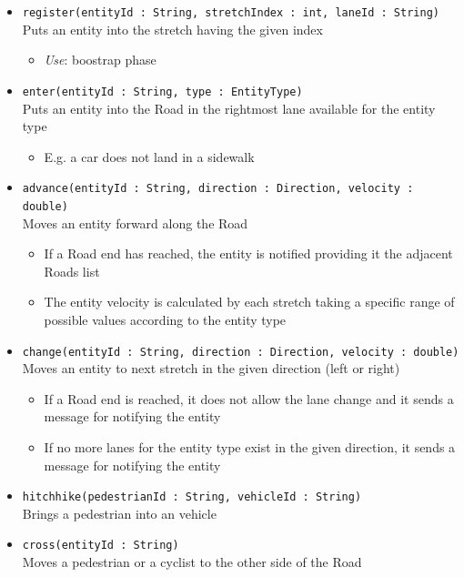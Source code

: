 \begin{itemize}
	\item \texttt{register(entityId : String, stretchIndex : int, laneId : String)}
	\\Puts an entity into the stretch having the given index
	\begin{itemize}
		\item \textit{Use}: boostrap phase
	\end{itemize}
	\item \texttt{enter(entityId : String, type : EntityType)}
	\\Puts an entity into the Road in the rightmost lane available for the entity type
	\begin{itemize}
		\item E.g. a car does not land in a sidewalk
	\end{itemize}
	\item \texttt{advance(entityId : String, direction : Direction, velocity : double)}
	\\Moves an entity forward along the Road	
	\begin{itemize}
		\item If a Road end has reached, the entity is notified providing it the adjacent Roads list
		\item The entity velocity is calculated by each stretch taking a specific range of possible values according to the entity type
	\end{itemize}
	\item \texttt{change(entityId : String, direction : Direction, velocity : double)}
	\\Moves an entity to next stretch in the given direction (left or right)	
	\begin{itemize}
		\item If a Road end is reached, it does not allow the lane change and it sends a message for notifying the entity
		\item If no more lanes for the entity type exist in the given direction, it sends a message for notifying the entity
	\end{itemize}
	\item \texttt{hitchhike(pedestrianId : String, vehicleId : String)}
	\\Brings a pedestrian into an vehicle
	\item \texttt{cross(entityId : String)}
	\\Moves a pedestrian or a cyclist to the other side of the Road
	\begin{itemize}

\end{itemize}
\end{itemize}
